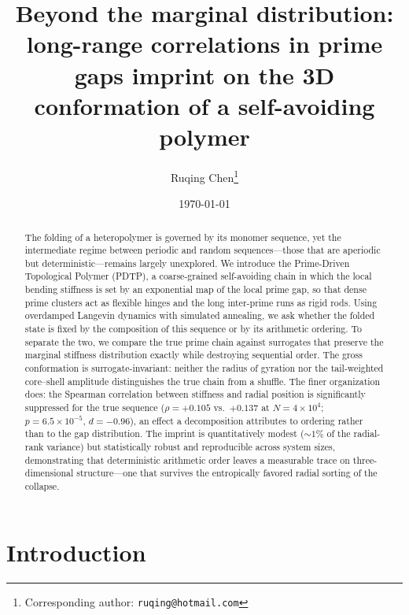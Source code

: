 \documentclass[11pt]{article}
\title{\bfseries Beyond the marginal distribution: long-range correlations in
prime gaps imprint on the 3D conformation of a self-avoiding polymer}
\author[1]{Ruqing Chen\thanks{Corresponding author: \texttt{ruqing@hotmail.com}}}
\affil[1]{GUT Geoservice Inc., Montreal, Quebec, Canada}
\date{\today}
\begin{document}
\maketitle

\begin{abstract}
The folding of a heteropolymer is governed by its monomer sequence, yet the
intermediate regime between periodic and random sequences---those that are
aperiodic but deterministic---remains largely unexplored. We introduce the
Prime-Driven Topological Polymer (PDTP), a coarse-grained self-avoiding chain in
which the local bending stiffness is set by an exponential map of the local prime
gap, so that dense prime clusters act as flexible hinges and the long inter-prime
runs as rigid rods. Using overdamped Langevin dynamics with simulated annealing,
we ask whether the folded state is fixed by the composition of this sequence or by
its arithmetic ordering. To separate the two, we compare the true prime chain
against surrogates that preserve the marginal stiffness distribution exactly while
destroying sequential order. The gross conformation is surrogate-invariant:
neither the radius of gyration nor the tail-weighted core--shell amplitude
distinguishes the true chain from a shuffle. The finer organization does: the
Spearman correlation between stiffness and radial position is significantly
suppressed for the true sequence ($\rho = +0.105$ vs.\ $+0.137$ at
$N = 4\times10^{4}$; $p = 6.5\times10^{-5}$, $d = -0.96$), an effect a
decomposition attributes to ordering rather than to the gap distribution. The
imprint is quantitatively modest ($\sim\!1\%$ of the radial-rank variance) but
statistically robust and reproducible across system sizes, demonstrating that
deterministic arithmetic order leaves a measurable trace on three-dimensional
structure---one that survives the entropically favored radial sorting of the
collapse.
\end{abstract}

\section{Introduction}
\end{document}
